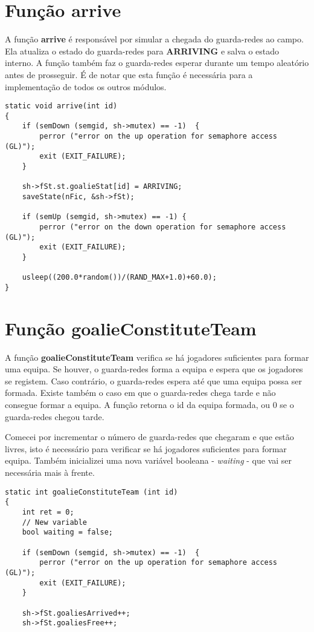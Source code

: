 \documentclass[code,math]{relatorio-deti}
\begin{document}
\section{Função \textbf{arrive}}

A função \textbf{arrive} é responsável por simular a chegada do guarda-redes ao campo. Ela atualiza o estado do guarda-redes para \textbf{ARRIVING} e salva o estado interno. A função também faz o guarda-redes esperar durante um tempo aleatório antes de prosseguir. É de notar que esta função é necessária para a implementação de todos os outros módulos.

\begin{verbatim}
static void arrive(int id)
{    
    if (semDown (semgid, sh->mutex) == -1)  {                          
        perror ("error on the up operation for semaphore access (GL)");
        exit (EXIT_FAILURE);
    }

    sh->fSt.st.goalieStat[id] = ARRIVING;
    saveState(nFic, &sh->fSt);

    if (semUp (semgid, sh->mutex) == -1) {                             
        perror ("error on the down operation for semaphore access (GL)");
        exit (EXIT_FAILURE);
    }

    usleep((200.0*random())/(RAND_MAX+1.0)+60.0);
}
\end{verbatim}

\section{Função \textbf{goalieConstituteTeam}}

A função \textbf{goalieConstituteTeam} verifica se há jogadores suficientes para formar uma equipa. Se houver, o guarda-redes forma a equipa e espera que os jogadores se registem. Caso contrário, o guarda-redes espera até que uma equipa possa ser formada. Existe também o caso em que o guarda-redes chega tarde e não consegue formar a equipa. A função retorna o id da equipa formada, ou 0 se o guarda-redes chegou tarde.
 
Comecei por incrementar o número de guarda-redes que chegaram e que estão livres, isto é necessário para verificar se há jogadores suficientes para formar equipa. Também inicializei uma nova variável booleana - \textit{waiting} - que vai ser necessária mais à frente.

\begin{verbatim}
static int goalieConstituteTeam (int id)
{
    int ret = 0;
    // New variable
    bool waiting = false;
    
    if (semDown (semgid, sh->mutex) == -1)  {
        perror ("error on the up operation for semaphore access (GL)");
        exit (EXIT_FAILURE);
    }

    sh->fSt.goaliesArrived++;
    sh->fSt.goaliesFree++;      
\end{verbatim}
\end{document}
